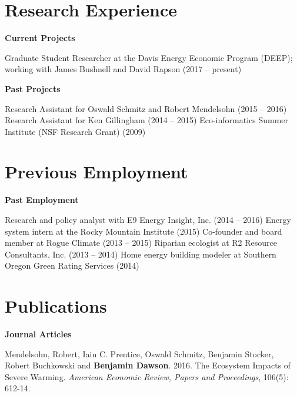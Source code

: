 \documentclass[letterpaper]{article}
\renewenvironment{itemize}{
  \begin{list}{}{
    \setlength{\leftmargin}{1.5em}
  }
}{
  \end{list}
}
\begin{document}
\section*{Research Experience}
\begin{itemize}
\item {\bf Current Projects}

\leftskip 0.5in
\parindent -0.5in
\subitem Graduate Student Researcher at the Davis Energy Economic Program (DEEP); working with James Bushnell and David Rapson (2017 -- present) \\


\leftskip 0in
\item {\bf Past Projects}

\leftskip 0.5in
\parindent -0.5in
\subitem Research Assistant for Oswald Schmitz and Robert Mendelsohn (2015 -- 2016)
\subitem Research Assistant for Ken Gillingham (2014 -- 2015)
\subitem Eco-informatics Summer Institute (NSF Research Grant) (2009)
\end{itemize}

\section*{Previous Employment}
\begin{itemize}
\leftskip 0in
\item {\bf Past Employment}

\leftskip 0.5in
\parindent -0.5in
\subitem Research and policy analyst with E9 Energy Insight, Inc. (2014 -- 2016) 
\subitem Energy system intern at the Rocky Mountain Institute (2015)
\subitem Co-founder and board member at Rogue Climate (2013 -- 2015)
\subitem Riparian ecologist at R2 Resource Consultants, Inc. (2013 -- 2014)
\subitem Home energy building modeler at Southern Oregon Green Rating Services (2014)
\end{itemize}

\section*{Publications}
\begin{itemize}
\leftskip 0in
\item {\bf Journal Articles}

\leftskip 0.5in
\parindent -0.5in
\subitem Mendelsohn, Robert, Iain C. Prentice, Oswald Schmitz, Benjamin Stocker, Robert Buchkowski and \textbf{Benjamin Dawson}. 2016. The Ecosystem Impacts of Severe Warming. \textit{American Economic Review, Papers and Proceedings}, 106(5): 612-14. \\

\leftskip 0in
%

\end{itemize}
\end{document}
